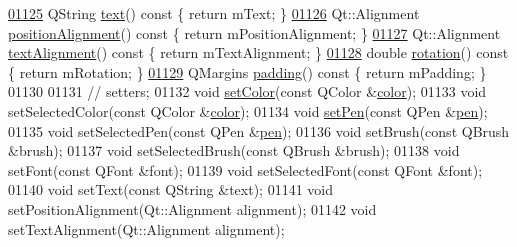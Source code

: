 \begin{DoxyCode}
\hypertarget{a00116_source_l01125}{}\hyperlink{a00041_a9547f7832010486abed0837e75db5330}{01125}   QString \hyperlink{a00041_a9547f7832010486abed0837e75db5330}{text}()\textcolor{keyword}{ const }\{ \textcolor{keywordflow}{return} mText; \}
\hypertarget{a00116_source_l01126}{}\hyperlink{a00041_af13c6adc480f268116ae72196eb44b06}{01126}   Qt::Alignment \hyperlink{a00041_af13c6adc480f268116ae72196eb44b06}{positionAlignment}()\textcolor{keyword}{ const }\{ \textcolor{keywordflow}{return} mPositionAlignment; \}
\hypertarget{a00116_source_l01127}{}\hyperlink{a00041_aaa1d84b3f61f9f2a0cce230e66ef7194}{01127}   Qt::Alignment \hyperlink{a00041_aaa1d84b3f61f9f2a0cce230e66ef7194}{textAlignment}()\textcolor{keyword}{ const }\{ \textcolor{keywordflow}{return} mTextAlignment; \}
\hypertarget{a00116_source_l01128}{}\hyperlink{a00041_ae8991207fa1697511c1c8af9f3ca0e0a}{01128}   \textcolor{keywordtype}{double} \hyperlink{a00041_ae8991207fa1697511c1c8af9f3ca0e0a}{rotation}()\textcolor{keyword}{ const }\{ \textcolor{keywordflow}{return} mRotation; \}
\hypertarget{a00116_source_l01129}{}\hyperlink{a00041_a00e0fa03822ff384bf4921c1c90322ff}{01129}   QMargins \hyperlink{a00041_a00e0fa03822ff384bf4921c1c90322ff}{padding}()\textcolor{keyword}{ const }\{ \textcolor{keywordflow}{return} mPadding; \}
01130   
01131   \textcolor{comment}{// setters;}
01132   \textcolor{keywordtype}{void} \hyperlink{a00116_a858bbcf98637471449e438304a00624b}{setColor}(\textcolor{keyword}{const} QColor &\hyperlink{a00116_ae35093fbf4f645dcefd930ca8c68b622}{color});
01133   \textcolor{keywordtype}{void} setSelectedColor(\textcolor{keyword}{const} QColor &\hyperlink{a00116_ae35093fbf4f645dcefd930ca8c68b622}{color});
01134   \textcolor{keywordtype}{void} \hyperlink{a00116_a499165f4744b6d22da7b24295910fb2c}{setPen}(\textcolor{keyword}{const} QPen &\hyperlink{a00116_a1f13fffa0a0faac34ec342973e613a4a}{pen});
01135   \textcolor{keywordtype}{void} setSelectedPen(\textcolor{keyword}{const} QPen &\hyperlink{a00116_a1f13fffa0a0faac34ec342973e613a4a}{pen});
01136   \textcolor{keywordtype}{void} setBrush(\textcolor{keyword}{const} QBrush &brush);
01137   \textcolor{keywordtype}{void} setSelectedBrush(\textcolor{keyword}{const} QBrush &brush);
01138   \textcolor{keywordtype}{void} setFont(\textcolor{keyword}{const} QFont &font);
01139   \textcolor{keywordtype}{void} setSelectedFont(\textcolor{keyword}{const} QFont &font);
01140   \textcolor{keywordtype}{void} setText(\textcolor{keyword}{const} QString &text);
01141   \textcolor{keywordtype}{void} setPositionAlignment(Qt::Alignment alignment);
01142   \textcolor{keywordtype}{void} setTextAlignment(Qt::Alignment alignment);

\end{DoxyCode}
